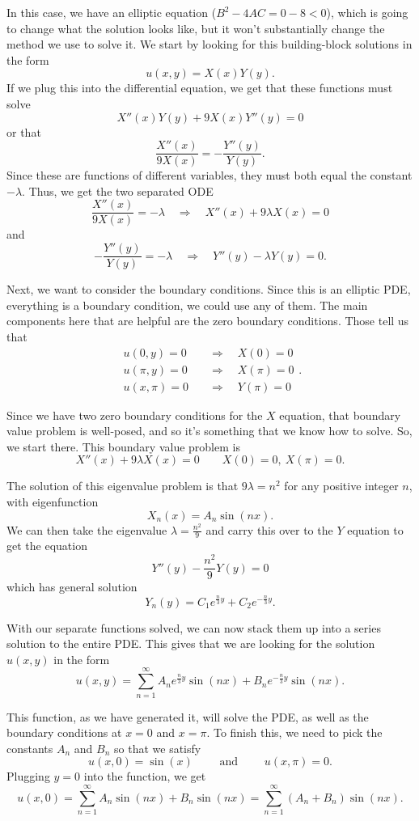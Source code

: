 \begin{exampleSol}
In this case, we have an elliptic equation ($B^2 - 4AC = 0 - 8 < 0$), which is going to change what the solution looks like, but it won't substantially change the method we use to solve it. We start by looking for this building-block solutions in the form
\[ u(x,y) = X(x)Y(y). \] If we plug this into the differential equation, we get that these functions must solve
\[ X''(x)Y(y) + 9X(x)Y''(y) = 0 \] or that
\[ \frac{X''(x)}{9X(x)} = - \frac{Y''(y)}{Y(y)}. \] Since these are functions of different variables, they must both equal the constant $-\lambda$. Thus, we get the two separated ODE
\[ \frac{X''(x)}{9X(x)} = -\lambda \quad \Rightarrow \quad X''(x) + 9\lambda X(x) = 0 \] and
\[ -\frac{Y''(y)}{Y(y)} = -\lambda \quad \Rightarrow \quad Y''(y) - \lambda Y(y) = 0. \]

Next, we want to consider the boundary conditions. Since this is an elliptic PDE, everything is a boundary condition, we could use any of them. The main components here that are helpful are the zero boundary conditions. Those tell us that
\[ \begin{split}
u(0, y) = 0 \quad & \Rightarrow \quad X(0) = 0  \\
u(\pi, y)  = 0 \quad & \Rightarrow \quad X(\pi) = 0 \\
u(x, \pi)  = 0 \quad & \Rightarrow \quad Y(\pi) = 0 
\end{split}. \]

Since we have two zero boundary conditions for the $X$ equation, that boundary value problem is well-posed, and so it's something that we know how to solve. So, we start there. This boundary value problem is
\[  X''(x) + 9\lambda X(x) = 0 \qquad X(0) = 0,\ X(\pi) = 0.\]

The solution of this eigenvalue problem is that $9\lambda = n^2$ for any positive integer $n$, with eigenfunction 
\[ X_n(x) = A_n \sin(n x). \] We can then take the eigenvalue $\lambda = \frac{n^2}{9}$ and carry this over to the $Y$ equation to get the equation
\[ Y''(y) - \frac{n^2}{9} Y(y) = 0 \] which has general solution
\[ Y_n(y) = C_1 e^{\frac{n}{3}y} + C_2 e^{-\frac{n}{3} y}. \]

With our separate functions solved, we can now stack them up into a series solution to the entire PDE. This gives that we are looking for the solution $u(x,y)$ in the form
\[ u(x,y) = \sum_{n=1}^\infty A_n e^{\frac{n}{3}y}\sin(nx) + B_n e^{-\frac{n}{3}y}\sin(nx). \]

This function, as we have generated it, will solve the PDE, as well as the boundary conditions at $x=0$ and $x=\pi$. To finish this, we need to pick the constants $A_n$ and $B_n$ so that we satisfy
\[ u(x, 0) = \sin(x) \qquad \text{ and } \qquad u(x,\pi) = 0. \] Plugging $y=0$ into the function, we get
\[ u(x,0) = \sum_{n=1}^\infty A_n \sin(nx) + B_n\sin(nx) = \sum_{n=1}^\infty (A_n + B_n) \sin(nx) .\]


\end{exampleSol}
